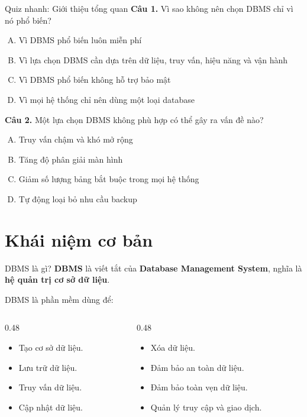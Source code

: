 \documentclass[aspectratio=169,11pt]{beamer}
\newcommand{\keyword}[1]{\textcolor{accent}{\textbf{#1}}}
\newcommand{\kw}[1]{\keyword{#1}}
\newcommand{\smallitem}{\setlength{\itemsep}{2pt}\setlength{\parskip}{0pt}}
\begin{document}
\begin{frame}{Quiz nhanh: Giới thiệu tổng quan}
\small
\textbf{Câu 1.} Vì sao không nên chọn DBMS chỉ vì nó phổ biến?
\begin{enumerate}[A.]
  \item Vì DBMS phổ biến luôn miễn phí
  \item Vì lựa chọn DBMS cần dựa trên dữ liệu, truy vấn, hiệu năng và vận hành
  \item Vì DBMS phổ biến không hỗ trợ bảo mật
  \item Vì mọi hệ thống chỉ nên dùng một loại database
\end{enumerate}

\textbf{Câu 2.} Một lựa chọn DBMS không phù hợp có thể gây ra vấn đề nào?
\begin{enumerate}[A.]
  \item Truy vấn chậm và khó mở rộng
  \item Tăng độ phân giải màn hình
  \item Giảm số lượng bảng bắt buộc trong mọi hệ thống
  \item Tự động loại bỏ nhu cầu backup
\end{enumerate}
\end{frame}

\section{Khái niệm cơ bản}

\begin{frame}{DBMS là gì?}
\kw{DBMS} là viết tắt của \kw{Database Management System}, nghĩa là \kw{hệ quản trị cơ sở dữ liệu}.

\vspace{2mm}
DBMS là phần mềm dùng để:
\begin{columns}[T]
\begin{column}{0.48\textwidth}
\begin{itemize}
  \smallitem
  \item Tạo cơ sở dữ liệu.
  \item Lưu trữ dữ liệu.
  \item Truy vấn dữ liệu.
  \item Cập nhật dữ liệu.
\end{itemize}
\end{column}
\begin{column}{0.48\textwidth}
\begin{itemize}
  \smallitem
  \item Xóa dữ liệu.
  \item Đảm bảo an toàn dữ liệu.
  \item Đảm bảo toàn vẹn dữ liệu.
  \item Quản lý truy cập và giao dịch.
\end{itemize}
\end{column}
\end{columns}
\end{frame}
\end{document}
